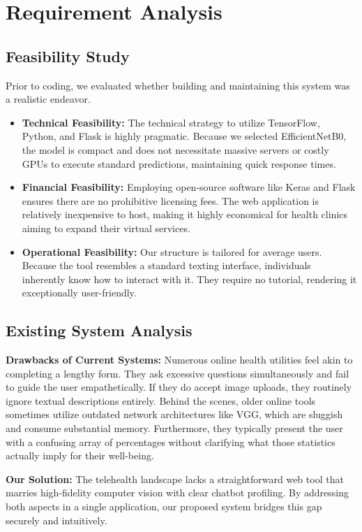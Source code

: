 \documentclass[conference]{IEEEtran}
\begin{document}
\section{Requirement Analysis}
\subsection{Feasibility Study}
Prior to coding, we evaluated whether building and maintaining this system was a realistic endeavor.
\begin{itemize}
    \item \textbf{Technical Feasibility:} The technical strategy to utilize TensorFlow, Python, and Flask is highly pragmatic. Because we selected EfficientNetB0, the model is compact and does not necessitate massive servers or costly GPUs to execute standard predictions, maintaining quick response times.
    \item \textbf{Financial Feasibility:} Employing open-source software like Keras and Flask ensures there are no prohibitive licensing fees. The web application is relatively inexpensive to host, making it highly economical for health clinics aiming to expand their virtual services.
    \item \textbf{Operational Feasibility:} Our structure is tailored for average users. Because the tool resembles a standard texting interface, individuals inherently know how to interact with it. They require no tutorial, rendering it exceptionally user-friendly.
\end{itemize}

\subsection{Existing System Analysis}
\textbf{Drawbacks of Current Systems:} Numerous online health utilities feel akin to completing a lengthy form. They ask excessive questions simultaneously and fail to guide the user empathetically. If they do accept image uploads, they routinely ignore textual descriptions entirely. Behind the scenes, older online tools sometimes utilize outdated network architectures like VGG, which are sluggish and consume substantial memory. Furthermore, they typically present the user with a confusing array of percentages without clarifying what those statistics actually imply for their well-being.

\textbf{Our Solution:} The telehealth landscape lacks a straightforward web tool that marries high-fidelity computer vision with clear chatbot profiling. By addressing both aspects in a single application, our proposed system bridges this gap securely and intuitively.
\end{document}
